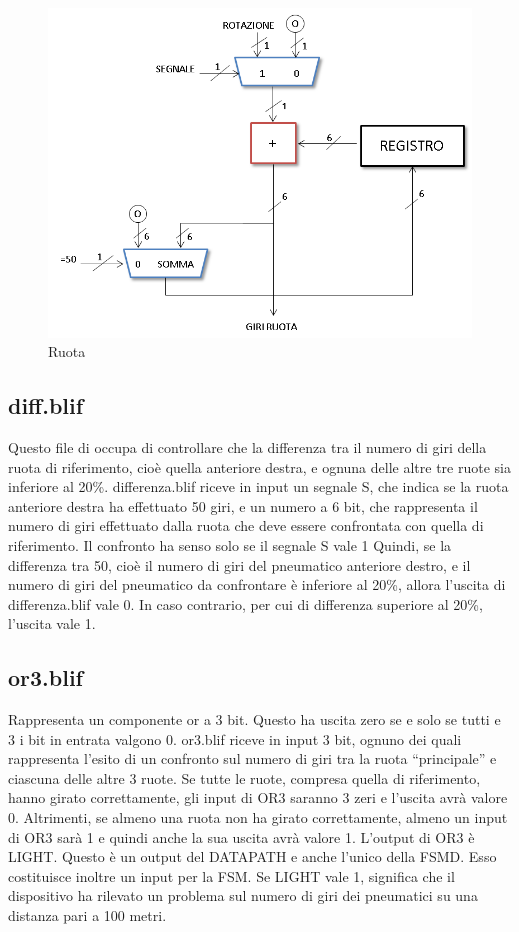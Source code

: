 \documentclass[a4paper,titlepage]{book}
\begin{document}
\begin{figure}[!hb]
\centering
\includegraphics[scale=0.5]{schemi/ruota.png}
\caption{Ruota}
\end{figure}


\subsection{diff.blif}

Questo file di occupa di controllare che la differenza tra il numero di giri della ruota di  riferimento, cioè quella anteriore destra, e ognuna delle altre tre ruote sia inferiore al 20\%.  differenza.blif riceve in input un segnale S, che indica se la ruota anteriore destra ha  effettuato 50 giri, e un numero a 6 bit, che rappresenta il numero di giri effettuato dalla  ruota che deve essere confrontata con quella di riferimento. Il confronto ha senso solo se  il segnale S vale 1  Quindi, se la differenza tra 50, cioè il numero di giri del pneumatico anteriore destro, e il  numero di giri del pneumatico da confrontare è inferiore al 20\%, allora l'uscita di  differenza.blif vale 0. In caso contrario, per cui di differenza superiore al 20\%, l'uscita vale  1.


\subsection{or3.blif}

Rappresenta un componente or a 3 bit. Questo ha uscita zero se e solo se tutti e 3 i bit in  entrata valgono 0.  or3.blif riceve in input 3 bit, ognuno dei quali rappresenta l'esito di un confronto sul  numero di giri tra la ruota ``principale'' e ciascuna delle altre 3 ruote.  Se tutte le ruote, compresa quella di riferimento, hanno girato correttamente, gli input di  OR3 saranno 3 zeri e l'uscita avrà valore 0.  Altrimenti, se almeno una ruota non ha girato correttamente, almeno un input di OR3 sarà  1 e quindi anche la sua uscita avrà valore 1.  L'output di OR3 è LIGHT. Questo è un output del DATAPATH e anche l'unico della FSMD.  Esso costituisce inoltre un input per la FSM.  Se LIGHT vale 1, significa che il dispositivo ha rilevato un problema sul numero di giri dei  pneumatici su una distanza pari a 100 metri.
\end{document}
